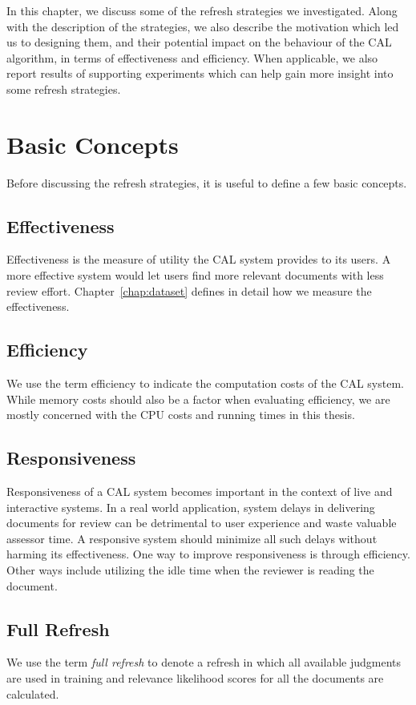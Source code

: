 \label{chap:refresh}
In this chapter, we discuss some of the refresh strategies we investigated.
Along with the description of the strategies, we also describe the motivation
which led us to designing them, and their potential impact on the behaviour of
the CAL algorithm, in terms of effectiveness and efficiency. When applicable, we
also report results of supporting experiments which can help gain more insight
into some refresh strategies.

\section{Basic Concepts}
Before discussing the refresh strategies, it is useful to define a few basic
concepts.
\subsection*{Effectiveness}
Effectiveness is the measure of utility the CAL system provides to its users. A
more effective system would let users find more relevant documents with less
review effort.  Chapter~\ref{chap:dataset} defines in detail how we measure the
effectiveness.

\subsection*{Efficiency}
We use the term efficiency to indicate the computation costs of the CAL system.
While memory costs should also be a factor when evaluating efficiency, we are
mostly concerned with the CPU costs and running times in this thesis.

\subsection*{Responsiveness}
Responsiveness of a CAL system becomes important in the context of live and
interactive systems. In a real world application, system delays in delivering
documents for review can be detrimental to user experience and waste valuable
assessor time. A responsive system should minimize all such delays without
harming its effectiveness. One way to improve responsiveness is through
efficiency.  Other ways include utilizing the idle time when the reviewer is
reading the document.

\subsection*{Full Refresh}
We use the term \textit{full refresh} to denote a refresh in which all
available judgments are used in training and relevance likelihood scores for all
the documents are calculated.

